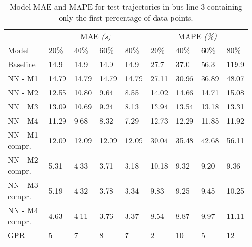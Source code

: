 \begin{table}[H]
  \centering
  \caption{Model MAE and MAPE for test trajectories in bus line 3 containing only the first percentage of data points.}
  \label{tbl:models-mae-and-mape-203}
  \begin{tabular}{l | l | l | l | l || l | l | l | l }
    & \multicolumn{4}{c}{MAE \textit{(s)}} & \multicolumn{4}{c}{MAPE \textit{(\%)}} \\
    Model      & 20\% & 40\% & 60\% & 80\% & 20\% & 40\% & 60\% & 80\% \\
    \hline
    Baseline & 14.9 & 14.9 & 14.9 & 14.9  & 27.7 & 37.0 & 56.3 & 119.9 \\
    NN - M1        & 14.79 &  14.79 & 14.79 &  14.79  & 27.11 & 30.96 & 36.89 & 48.07 \\
    NN - M2        & 12.55 &  10.80 & 9.64 &  8.55  & 14.02 & 14.66 & 14.71 & 15.08 \\
    NN - M3        & 13.09 &  10.69 & 9.24 &  8.13  & 13.94 & 13.54 & 13.18 & 13.31 \\
    NN - M4        & 11.29 &  9.68 & 8.32 &  7.29  & 12.73 & 12.29 & 11.85 & 11.92 \\
    NN - M1 compr.        & 12.09 &  12.09 & 12.09 &  12.09  & 30.04 & 35.48 & 42.68 & 56.11 \\
    NN - M2 compr.       & 5.31 &  4.33 & 3.71 &  3.18  & 10.18 & 9.32 & 9.20 & 9.36 \\
    NN - M3 compr.       & 5.19 &  4.32 & 3.78 &  3.34  & 9.83 & 9.25 & 9.45 & 10.25 \\
    NN - M4 compr.       & 4.63 &  4.11 & 3.76 &  3.37  & 8.54 & 8.87 & 9.97 & 11.11 \\
    GPR        & 5 &  7 & 8 &  7  & 2 & 10 & 5 & 12 \\
  \end{tabular}
\end{table}

